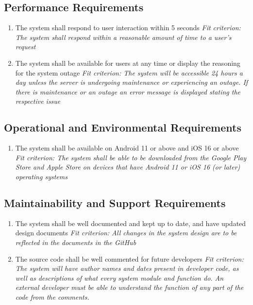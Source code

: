 \documentclass[12pt]{article}
\begin{document}
\subsection{Performance Requirements}
\begin{enumerate}[PR\arabic*.]
	\item The system shall respond to user interaction within 5 seconds\newline
    \textit{Fit criterion: The system shall respond within a reasonable amount of time to a user's request}
    \item The system shall be available for users at any time or display the reasoning for the system outage\newline
    \textit{Fit criterion: The system will be accessible 24 hours a day unless the server is undergoing maintenance or experiencing an outage. If there is maintenance or an outage an error message is displayed stating the respective issue }
\end{enumerate}
\subsection{Operational and Environmental Requirements}
\begin{enumerate}[OE\arabic*.]
    \item The system shall be available on Android 11 or above and iOS 16 or above\newline
    \textit{Fit criterion: The system shall be able to be downloaded from the Google Play Store and Apple Store on devices that have Android 11 or iOS 16 (or later) operating systems}
\end{enumerate}
\subsection{Maintainability and Support Requirements}
\begin{enumerate}[MS\arabic*.]
    \item The system shall be well documented and kept up to date, and have updated design documents\newline
    \textit{Fit criterion: All changes in the system design are to be reflected in the documents in the GitHub}
    \item The source code shall be well commented for future developers\newline
    \textit{Fit criterion: The system will have author names and dates present in developer code, as well as descriptions of what every system module and function do. An external developer must be able to understand the function of any part of the code from the comments.}
\end{enumerate}
\end{document}

